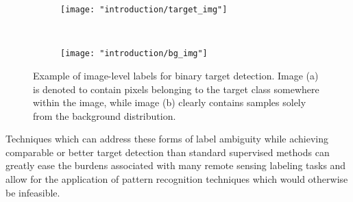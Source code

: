 \begin{figure*}[t!]
	\centering
	\begin{subfigure}[t]{0.5\textwidth}
		\centering
		\texttt{[image: "introduction/target\_img"]}
		\caption{}
	\end{subfigure}%
	~ 
	\begin{subfigure}[t]{0.5\textwidth}
		\centering
		\texttt{[image: "introduction/bg\_img"]}
		\caption{}
	\end{subfigure}
	\caption[Examples of image-level labels.]{Example of image-level labels for binary target detection.  Image (a) is denoted to contain pixels belonging to the target class somewhere within the image, while image (b) clearly contains samples solely from the background distribution.}
	\label{fig:binary_targets}%
\end{figure*}

Techniques which can address these forms of label ambiguity while achieving comparable or better target detection than standard supervised methods can greatly ease the burdens associated with many remote sensing labeling tasks and allow for the application of pattern recognition techniques which would otherwise be infeasible.

